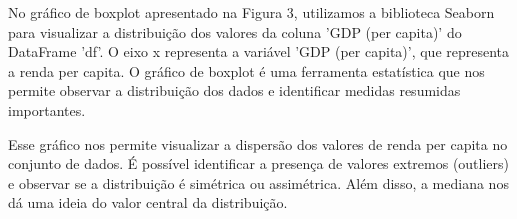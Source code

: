 \documentclass[conference]{IEEEtran}
\begin{document}
\begin{figure}[htbp]
  \centering
  \begin{floatrow}
  \end{floatrow}
\end{figure}

No gráfico de boxplot apresentado na Figura 3, utilizamos a biblioteca Seaborn para visualizar a distribuição dos valores da coluna 'GDP (per capita)' do DataFrame 'df'. O eixo x representa a variável 'GDP (per capita)', que representa a renda per capita. O gráfico de boxplot é uma ferramenta estatística que nos permite observar a distribuição dos dados e identificar medidas resumidas importantes.

Esse gráfico nos permite visualizar a dispersão dos valores de renda per capita no conjunto de dados. É possível identificar a presença de valores extremos (outliers) e observar se a distribuição é simétrica ou assimétrica. Além disso, a mediana nos dá uma ideia do valor central da distribuição.
\end{document}

